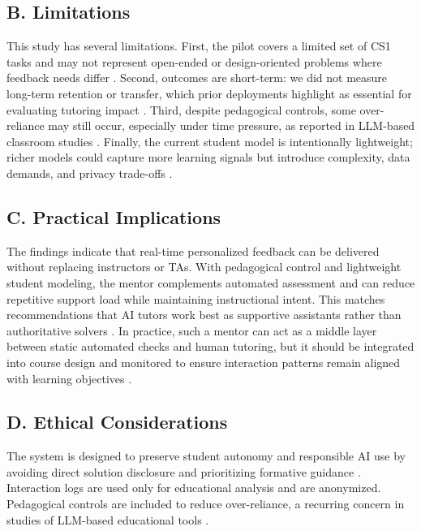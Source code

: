 \documentclass[conference]{IEEEtran}
\begin{document}
\subsection*{B. Limitations}

This study has several limitations. First, the pilot covers a limited set of CS1 tasks and may not represent open-ended or design-oriented problems where feedback needs differ \cite{ProgTutor}. Second, outcomes are short-term: we did not measure long-term retention or transfer, which prior deployments highlight as essential for evaluating tutoring impact \cite{FeasibilityStudyofAugmentingTeachingAssistantswithAI}. Third, despite pedagogical controls, some over-reliance may still occur, especially under time pressure, as reported in LLM-based classroom studies \cite{DesirableCharacteristicsforAITeachingAssistantsinProgrammingEducation,PatternsofLLMPoweredProgrammingAssistant}. Finally, the current student model is intentionally lightweight; richer models could capture more learning signals but introduce complexity, data demands, and privacy trade-offs \cite{AIEnabledIntelligentAssistant}.

\subsection*{C. Practical Implications}

The findings indicate that real-time personalized feedback can be delivered without replacing instructors or TAs. With pedagogical control and lightweight student modeling, the mentor complements automated assessment and can reduce repetitive support load while maintaining instructional intent. This matches recommendations that AI tutors work best as supportive assistants rather than authoritative solvers \cite{CodeAid,ImprovingAIinCS50}. In practice, such a mentor can act as a middle layer between static automated checks and human tutoring, but it should be integrated into course design and monitored to ensure interaction patterns remain aligned with learning objectives \cite{FeasibilityStudyofAugmentingTeachingAssistantswithAI}.

\subsection*{D. Ethical Considerations}

The system is designed to preserve student autonomy and responsible AI use by avoiding direct solution disclosure and prioritizing formative guidance \cite{DesirableCharacteristicsforAITeachingAssistantsinProgrammingEducation}. Interaction logs are used only for educational analysis and are anonymized. Pedagogical controls are included to reduce over-reliance, a recurring concern in studies of LLM-based educational tools \cite{CodeAid,PatternsofLLMPoweredProgrammingAssistant}.
\end{document}
